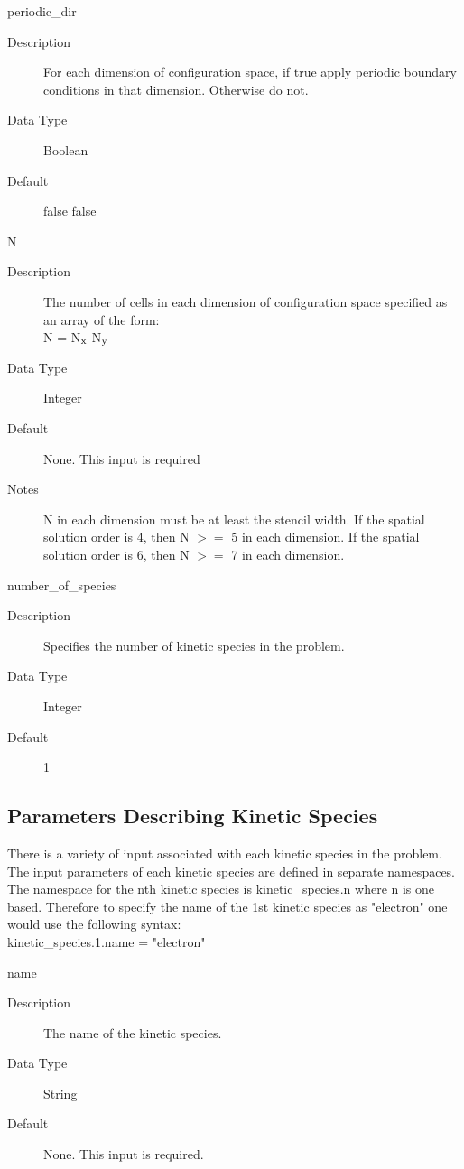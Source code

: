 \documentclass[11pt]{amsart}
\begin{document}
periodic\_dir
\begin{description}
\item [Description] For each dimension of configuration space, if true apply
periodic boundary conditions in that dimension.  Otherwise do not.
\item [Data Type] Boolean
\item [Default] false false
\end{description}

N
\begin{description}
\item [Description] The number of cells in each dimension of configuration
space specified as an array of the form: \\
N = N$_\textnormal{x}$ N$_\textnormal{y}$
\item [Data Type] Integer
\item [Default] None.  This input is required
\item [Notes] N in each dimension must be at least the stencil width.  If the
spatial solution order is 4, then N $>=$ 5 in each dimension.  If the
spatial solution order is 6, then N $>=$ 7 in each dimension.
\end{description}

number\_of\_species
\begin{description}
\item [Description] Specifies the number of kinetic species in the problem.
\item [Data Type] Integer
\item [Default] 1
\end{description}

\subsection*{Parameters Describing Kinetic Species}
There is a variety of input associated with each kinetic species in the
problem.  The input parameters of each kinetic species are defined in separate
namespaces.  The namespace for the nth kinetic species is kinetic\_species.n
where n is one based.  Therefore to specify the name of the 1st kinetic species
as "electron" one would use the following syntax: \\
kinetic\_species.1.name = "electron"

name
\begin{description}
\item [Description] The name of the kinetic species.
\item [Data Type] String
\item [Default] None.  This input is required.
\end{description}
\end{document}
